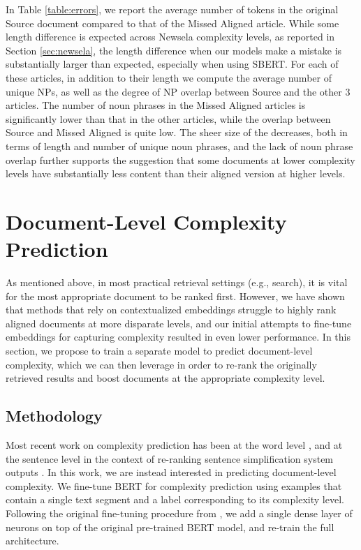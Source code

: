 \documentclass[thesis.tex]{subfiles}
\begin{document}
In Table \ref{table:errors}, we report the average number of tokens in the original Source document compared to that of the Missed Aligned article. While some length difference is expected across Newsela complexity levels, as reported in Section \ref{sec:newsela}, the length difference when our models make a mistake is substantially larger than expected, especially when using SBERT. For each of these articles, in addition to their length we compute the average number of unique NPs, as well as the degree of NP overlap between Source and the other 3 articles. The number of noun phrases in the Missed Aligned articles is significantly lower than that in the other articles, while the overlap between Source and Missed Aligned is quite low. The sheer size of the decreases, both in terms of length and number of unique noun phrases, and the lack of noun phrase overlap further supports the suggestion that some documents at lower complexity levels have substantially less content than their aligned version at higher levels.

\section{Document-Level Complexity Prediction} \label{sec:comp_pred}

As mentioned above, in most practical retrieval settings (e.g., search), it is vital for the most appropriate document to be ranked first. However, we have shown that methods that rely on contextualized embeddings struggle to highly rank aligned documents at more disparate levels, and our initial attempts to fine-tune embeddings for capturing complexity resulted in even lower performance. In this section, we propose to train a separate model to predict document-level complexity, which we can then leverage in order to re-rank the originally retrieved results and boost documents at the appropriate complexity level.

\subsection{Methodology} \label{sec:methods_comp_pred}

Most recent work on complexity prediction has been at the word level \citep{shardlow2013comparison}, and at the sentence level in the context of re-ranking sentence simplification system outputs \citep{zhang2017sentence}. In this work, we are instead interested in predicting document-level complexity. We fine-tune BERT for complexity prediction using examples that contain a single text segment and a label corresponding to its complexity level. Following the original fine-tuning procedure from \cite{devlin2019bert}, we add a single dense layer of neurons on top of the original pre-trained BERT model, and re-train the full architecture.
\end{document}
